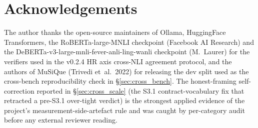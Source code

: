 \documentclass[11pt,a4paper]{article}
\begin{document}
\section*{Acknowledgements}

The author thanks the open-source maintainers of Ollama, HuggingFace Transformers, the RoBERTa-large-MNLI checkpoint (Facebook AI Research) and the DeBERTa-v3-large-mnli-fever-anli-ling-wanli checkpoint (M.~Laurer) for the verifiers used in the v0.2.4 HR axis cross-NLI agreement protocol, and the authors of MuSiQue (Trivedi et~al.~2022) for releasing the dev split used as the cross-bench reproducibility check in \S\ref{sec:cross_bench}. The honest-framing self-correction reported in \S\ref{sec:cross_scale} (the S3.1 contract-vocabulary fix that retracted a pre-S3.1 over-tight verdict) is the strongest applied evidence of the project's measurement-side-artefact rule and was caught by per-category audit before any external reviewer reading.



\end{document}
